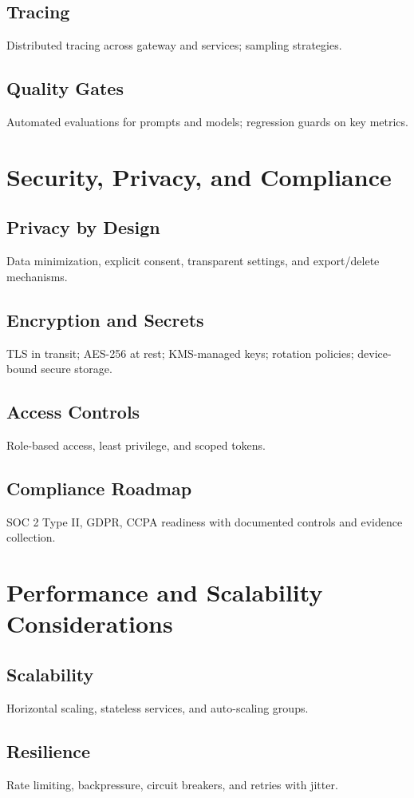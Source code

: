 \documentclass[12pt,a4paper]{article}
\begin{document}
\subsection{Tracing}
Distributed tracing across gateway and services; sampling strategies.
\subsection{Quality Gates}
Automated evaluations for prompts and models; regression guards on key metrics.

\section{Security, Privacy, and Compliance}
\subsection{Privacy by Design}
Data minimization, explicit consent, transparent settings, and export/delete mechanisms.
\subsection{Encryption and Secrets}
TLS in transit; AES-256 at rest; KMS-managed keys; rotation policies; device-bound secure storage.
\subsection{Access Controls}
Role-based access, least privilege, and scoped tokens.
\subsection{Compliance Roadmap}
SOC 2 Type II, GDPR, CCPA readiness with documented controls and evidence collection.

\section{Performance and Scalability Considerations}
\subsection{Scalability}
Horizontal scaling, stateless services, and auto-scaling groups.
\subsection{Resilience}
Rate limiting, backpressure, circuit breakers, and retries with jitter.
\end{document}
